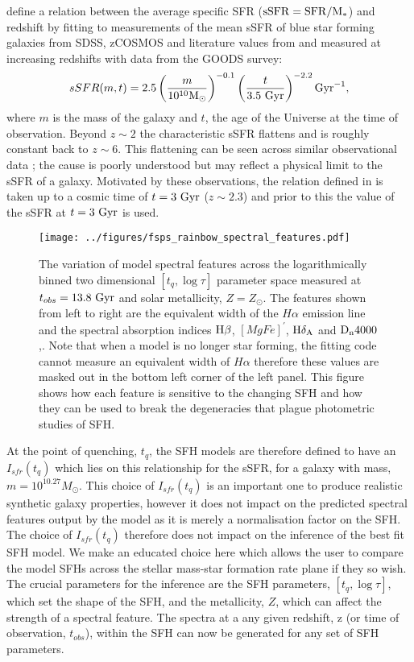 \documentclass[useAMS,usenatbib]{mn2e}
\begin{document}
\citet[][Equation 1]{peng10} define a relation between the average specific SFR ($\rm{sSFR}=SFR/M_*$) and redshift by fitting to measurements of the mean sSFR of blue star forming galaxies from SDSS, zCOSMOS and literature values from \cite{elbaz07} and \cite{daddi07} measured at increasing redshifts with data from the GOODS survey:
\begin{equation}\label{eq:peng}
sSFR(m,t) = 2.5 \left( \frac{m}{10^{10} \rm{M}_{\odot}} \right)^{-0.1} \left(\frac{t}{3.5 ~\rm{Gyr}}\right)^{-2.2} \rm{Gyr}^{-1},
\end{equation}
where $m$ is the mass of the galaxy and $t$, the age of the Universe at the time of observation. Beyond $z \sim 2$ the characteristic sSFR flattens and is roughly constant back to $z\sim6$. This flattening can be seen across similar observational data \citep{peng10, gonzalez10, bethermin12}; the cause is poorly understood but may reflect a physical limit to the sSFR of a galaxy. Motivated by these observations, the relation defined in \citet{peng10} is taken up to a cosmic time of $t=3~\rm{Gyr}$ ($z \sim 2.3$) and prior to this the value of the sSFR at $t=3~\rm{Gyr}$ is used. 

\begin{figure*}
\centering
\texttt{[image: ../figures/fsps\_rainbow\_spectral\_features.pdf]}
\caption{The variation of model spectral features across the logarithmically binned two dimensional $[t_q, \log \tau]$ parameter space measured at $t_{obs}=13.8~\rm{Gyr}$ and solar metallicity, $Z=Z_{\odot}$. The features shown from left to right are the equivalent width of the $H\alpha$ emission line and the spectral absorption indices $\rm{H}\beta$, $[MgFe]^{\prime}$, $\rm{H}\delta_A$ and $\rm{D}_n4000$,. Note that when a model is no longer star forming, the fitting code cannot measure an equivalent width of $H\alpha$ therefore these values are masked out in the bottom left corner of the left panel. This figure shows how each feature is sensitive to the changing SFH and how they can be used to break the degeneracies that plague photometric studies of SFH. }
\label{fig:rainbow}
\end{figure*}

At the point of quenching, $t_{q}$, the SFH models are therefore defined to have an $I_{sfr}(t_q)$ which lies on this relationship for the sSFR, for a galaxy with mass, $m = 10^{10.27} M_{\odot}$. This choice of $I_{sfr}(t_q)$ is an important one to produce realistic synthetic galaxy properties, however it does not impact on the predicted spectral features output by the model as it is merely a normalisation factor on the SFH. The choice of $I_{sfr}(t_q)$ therefore does not impact on the inference of the best fit SFH model. We make an educated choice here which allows the user to compare the model SFHs across the stellar mass-star formation rate plane if they so wish. The crucial parameters for the inference are the SFH parameters, $[t_q, \log \tau]$, which set the shape of the SFH, and the metallicity, $Z$, which can affect the strength of a spectral feature. The spectra at a any given redshift, z (or time of observation, $t_{obs}$), within the SFH can now be generated for any set of SFH parameters.
\end{document}
